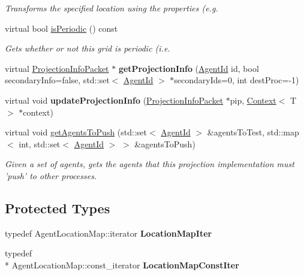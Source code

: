 \begin{DoxyCompactItemize}
\begin{DoxyCompactList}\small\item\em Transforms the specified location using the properties (e.\-g. \end{DoxyCompactList}\item 
virtual bool \hyperlink{classrepast_1_1_base_grid_a4dd5ec33acc952ab136f5e2b9886771e}{is\-Periodic} () const 
\begin{DoxyCompactList}\small\item\em Gets whether or not this grid is periodic (i.\-e. \end{DoxyCompactList}\item 
\hypertarget{classrepast_1_1_base_grid_a51685b60fcfb3081007b22559225af8f}{virtual \hyperlink{classrepast_1_1_projection_info_packet}{Projection\-Info\-Packet} $\ast$ {\bfseries get\-Projection\-Info} (\hyperlink{classrepast_1_1_agent_id}{Agent\-Id} id, bool secondary\-Info=false, std\-::set$<$ \hyperlink{classrepast_1_1_agent_id}{Agent\-Id} $>$ $\ast$secondary\-Ids=0, int dest\-Proc=-\/1)}\label{classrepast_1_1_base_grid_a51685b60fcfb3081007b22559225af8f}

\item 
\hypertarget{classrepast_1_1_base_grid_ac95c2c141f8b8365472c2f47df614554}{virtual void {\bfseries update\-Projection\-Info} (\hyperlink{classrepast_1_1_projection_info_packet}{Projection\-Info\-Packet} $\ast$pip, \hyperlink{classrepast_1_1_context}{Context}$<$ T $>$ $\ast$context)}\label{classrepast_1_1_base_grid_ac95c2c141f8b8365472c2f47df614554}

\item 
virtual void \hyperlink{classrepast_1_1_base_grid_a8f718ade5af8285f71151eea824ce3cd}{get\-Agents\-To\-Push} (std\-::set$<$ \hyperlink{classrepast_1_1_agent_id}{Agent\-Id} $>$ \&agents\-To\-Test, std\-::map$<$ int, std\-::set$<$ \hyperlink{classrepast_1_1_agent_id}{Agent\-Id} $>$ $>$ \&agents\-To\-Push)
\begin{DoxyCompactList}\small\item\em Given a set of agents, gets the agents that this projection implementation must 'push' to other processes. \end{DoxyCompactList}\end{DoxyCompactItemize}
\subsection*{Protected Types}
\begin{DoxyCompactItemize}
\item 
\hypertarget{classrepast_1_1_base_grid_acd798e07433e8da414ea2c9ce689f767}{typedef Agent\-Location\-Map\-::iterator {\bfseries Location\-Map\-Iter}}\label{classrepast_1_1_base_grid_acd798e07433e8da414ea2c9ce689f767}

\item 
\hypertarget{classrepast_1_1_base_grid_a42588a88a435a0d3447c4752dd05b3ff}{typedef \\*
Agent\-Location\-Map\-::const\-\_\-iterator {\bfseries Location\-Map\-Const\-Iter}}\label{classrepast_1_1_base_grid_a42588a88a435a0d3447c4752dd05b3ff}

\end{DoxyCompactItemize}

